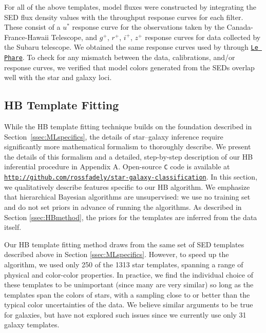 \documentclass[12pt,preprint]{aastex}
\begin{document}
For all of the above templates, model fluxes were constructed by 
integrating the SED flux density values with the throughput response 
curves for each filter.  These consist of a $u^\ast$ response curve for 
the observations taken by the Canada-France-Hawaii Telescope, and 
$g^+$, $r^+$, $i^+$, $z^+$ response curves for data 
collected by the Subaru telescope.  We obtained the same response 
curves used by \citet{ilbert09} through 
\href{http://www.cfht.hawaii.edu/\%7Earnouts/LEPHARE/lephare.html}
{\texttt{Le Phare}}\footnotemark[5].  To check for any mismatch between 
the data, calibrations, and/or response curves, we verified that model 
colors generated from the SEDs overlap well with the star and galaxy loci.

\subsection{HB Template Fitting}
\label{ssec:HBspecifics}

While the HB template fitting technique builds on the foundation
described in Section~\ref{ssec:MLspecifics}, the details of
star--galaxy inference require significantly more mathematical
formalism to thoroughly describe.  We present the details of this
formalism and a detailed, step-by-step description of our HB
inferential procedure in Appendix A.  Open-source \texttt{C} code is
available at {\footnotesize
  \texttt{\url{http://github.com/rossfadely/star-galaxy-classification}}}.
In this section, we qualitatively describe features specific to our HB
algorithm.  We emphasize that hierarchical Bayesian algorithms are
unsupervised: we use no training set and do not set priors in advance
of running the algorithms.  As described in Section \ref{ssec:HBmethod}, 
the priors for the templates are inferred from the data itself.

Our HB template fitting method draws from the same set of SED
templates described above in Section \ref{ssec:MLspecifics}.  However,
to speed up the algorithm, we used only 250 of the 1313 star
templates, spanning a range of physical and color-color properties.  In 
practice, we find the individual choice of these templates to be 
unimportant (since many are very similar) so long as the templates span 
the colors of stars, with a sampling close to or better than the typical color 
uncertainties of the data.  We believe similar arguments to be true for 
galaxies, but have not explored such issues since we currently use only 
31 galaxy templates.
\end{document}
